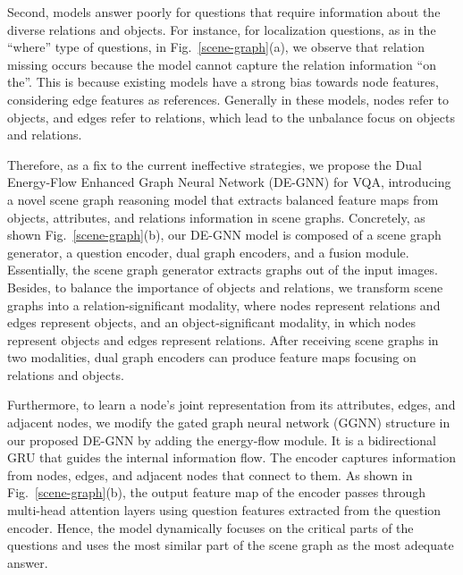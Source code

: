 \documentclass[letterpaper]{article} %
\begin{document}
Second, models answer poorly for questions that require information about the diverse relations and objects. For instance, for localization questions, as in the ``where'' type of questions, in Fig.~\ref{scene-graph}(a), we observe that relation missing occurs because the model cannot capture the relation information ``on the''. This is because existing models have a strong bias towards node features, considering edge features as references. Generally in these models, nodes refer to objects, and edges refer to relations, which lead to the unbalance focus on objects and relations. 


Therefore, as a fix to the current ineffective strategies, we propose the Dual Energy-Flow Enhanced Graph Neural Network (DE-GNN) for VQA, introducing a novel scene graph reasoning model that extracts balanced feature maps from objects, attributes, and relations information in scene graphs. 
Concretely, as shown Fig.~\ref{scene-graph}(b), our DE-GNN model is composed of a scene graph generator, a question encoder, dual graph encoders, and a fusion module. 
Essentially, the scene graph generator extracts graphs out of the input images. 
Besides, to balance the importance of objects and relations, we transform scene graphs into a relation-significant modality, where nodes represent relations and edges represent objects, and an object-significant modality, in which nodes represent objects and edges represent relations. 
After receiving scene graphs in two modalities, dual graph encoders can produce feature maps focusing on relations and objects.

Furthermore, to learn a node's joint representation from its attributes, edges, and adjacent nodes, we modify the gated graph neural network (GGNN) structure in our proposed DE-GNN by adding the energy-flow module. It is a bidirectional GRU that guides the internal information flow.
The encoder captures information from nodes, edges, and adjacent nodes that connect to them. 
As shown in Fig.~\ref{scene-graph}(b), the output feature map of the encoder passes through multi-head attention layers using question features extracted from the question encoder. 
Hence, the model dynamically focuses on the critical parts of the questions and uses the most similar part of the scene graph as the most adequate answer.
\end{document}

